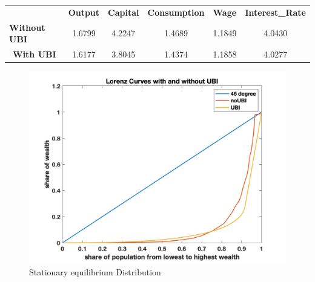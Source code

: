 \documentclass[letterpaper,12pt]{article}
\begin{document}
\begin{table}
\begin{tabular}{@{}lccccc@{}}
\textbf{}                             & \multicolumn{1}{l}{\textbf{Output}} & \multicolumn{1}{l}{\textbf{Capital}} & \multicolumn{1}{l}{\textbf{Consumption}} & \multicolumn{1}{l}{\textbf{Wage}} & \multicolumn{1}{l}{\textbf{Interest\_Rate}} \\ \cmidrule(l){2-6} 
\textbf{Without UBI}                  & 1.6799                              & 4.2247                               & 1.4689                                   & 1.1849                            & 4.0430                                      \\
\multicolumn{1}{c}{\textbf{With UBI}} & 1.6177                              & 3.8045                               & 1.4374                                   & 1.1858                            & 4.0277                                     
\end{tabular}
\end{table}

\begin{figure}
\includegraphics[scale=0.5]{Figures/Part2_UBI/Lorenz_Wealth}
\caption{Stationary equilibrium Distribution}
\end{figure}
\end{document}
